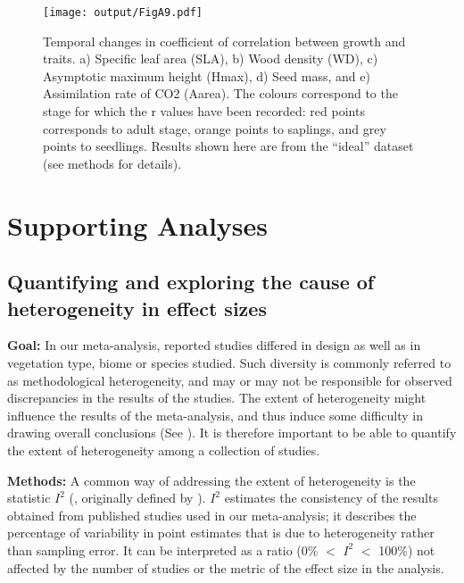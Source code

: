 \documentclass[a4paper,11pt]{article}
\begin{document}
\begin{appendices}
\begin{figure}[h!]
\centering
\texttt{[image: output/FigA9.pdf]}
\caption{Temporal changes in coefficient of correlation between growth and traits. a) Specific leaf area (SLA), b) Wood density (WD), c) Asymptotic maximum height (Hmax), d) Seed mass, and e) Assimilation rate of CO2 (Aarea). The colours correspond to the stage for which the r values have been recorded: red points corresponds to adult stage, orange points to saplings, and grey points to seedlings. Results shown here are from the ``ideal'' dataset (see methods for details).}
\label{fig:figA9}
\end{figure}

\clearpage
\section{Supporting Analyses}\label{app:supp_info_analyses}
\subsection{Quantifying and exploring the cause of heterogeneity in effect sizes}

\textbf{Goal:} In our meta-analysis, reported studies differed in design as well as in vegetation type, biome or species studied. Such diversity is commonly referred to as methodological heterogeneity, and may or may not be responsible for observed discrepancies in the results of the studies. The extent of heterogeneity might influence the results of the meta-analysis, and thus induce some difficulty in drawing overall conclusions (See \citealt{Higgins:2002iq}). It is therefore important to be able to quantify the extent of heterogeneity among a collection of studies.

\textbf{Methods:} A common way of addressing the extent of heterogeneity is the statistic $I^{2}$ (\citealt{Santos:2012gt}, originally defined by \citealt{Higgins:2002iq}). $I^{2}$ estimates the consistency of the results obtained from published studies used in our meta-analysis; it describes the percentage of variability in point estimates that is due to heterogeneity rather than sampling error. It can be interpreted as a ratio (0\% $<$ $I^{2}$ $<$ 100\%) not affected by the number of studies or the metric of the effect size in the analysis. 


\end{appendices}
\end{document}
